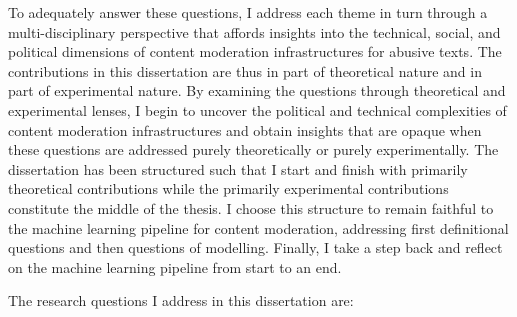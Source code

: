 To adequately answer these questions, I address each theme in turn through a multi-disciplinary perspective that affords insights into the technical, social, and political dimensions of content moderation infrastructures for abusive texts.
The contributions in this dissertation are thus in part of theoretical nature and in part of experimental nature.
By examining the questions through theoretical and experimental lenses, I begin to uncover the political and technical complexities of content moderation infrastructures and obtain insights that are opaque when these questions are addressed purely theoretically or purely experimentally.
The dissertation has been structured such that I start and finish with primarily theoretical contributions while the primarily experimental contributions constitute the middle of the thesis.
I choose this structure to remain faithful to the machine learning pipeline for content moderation, addressing first definitional questions and then questions of modelling.
Finally, I take a step back and reflect on the machine learning pipeline from start to an end.

The research questions I address in this dissertation are:

